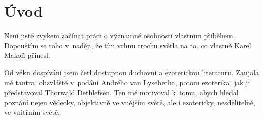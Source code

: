 \chapter{Úvod}
\label{kap:uvod}

Není jistě zvykem začínat práci o významné osobnosti vlastním příběhem.
Dopouštím se toho v~naději, že tím vrhnu trochu světla na to, co vlastně Karel
Makoň přinesl.

Od věku dospívání jsem četl dostupnou duchovní a ezoterickou literaturu. Zaujala
mě tantra, obzvláště v~podání Andrého van Lysebetha\cite{LysebethTantra}, potom
ezoterika, jak ji představoval Thorwald Dethlefsen\cite{DethlefsenOsud}. Ten mě
motivoval k~tomu, abych hledal poznání nejen vědecky, objektivně ve vnějším
světě, ale i ezotericky, nesdělitelně, ve vnitřním světě. 
